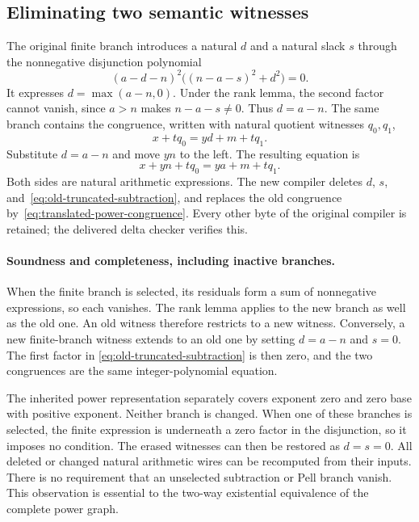 \subsection{Eliminating two semantic witnesses}

The original finite branch introduces a natural $d$ and a natural slack $s$
through the nonnegative disjunction polynomial
\begin{equation}\label{eq:old-truncated-subtraction}
 (a-d-n)^2\bigl((n-a-s)^2+d^2\bigr)=0.
\end{equation}
It expresses $d=\max(a-n,0)$. Under the rank lemma, the second factor
cannot vanish, since $a>n$ makes $n-a-s\ne0$. Thus $d=a-n$.
The same branch contains the congruence, written with natural quotient
witnesses $q_0,q_1$,
\[
 x+tq_0=yd+m+tq_1.
\]
Substitute $d=a-n$ and move $yn$ to the left. The resulting equation is
\begin{equation}\label{eq:translated-power-congruence}
 x+yn+tq_0=ya+m+tq_1.
\end{equation}
Both sides are natural arithmetic expressions. The new compiler deletes
$d$, $s$, and~\eqref{eq:old-truncated-subtraction}, and replaces the old
congruence by~\eqref{eq:translated-power-congruence}. Every other byte of
the original compiler is retained; the delivered delta checker verifies this.

\paragraph{Soundness and completeness, including inactive branches.}
When the finite branch is selected, its residuals form a sum of
nonnegative expressions, so each vanishes. The rank lemma applies to the
new branch as well as the old one. An old witness therefore restricts to a
new witness. Conversely, a new finite-branch witness extends to an old one
by setting $d=a-n$ and $s=0$. The first factor in
\eqref{eq:old-truncated-subtraction} is then zero, and the two congruences
are the same integer-polynomial equation.

The inherited power representation separately covers exponent zero and
zero base with positive exponent. Neither branch is changed. When one of
these branches is selected, the finite expression is underneath a zero
factor in the disjunction, so it imposes no condition. The erased witnesses
can then be restored as $d=s=0$. All deleted or changed natural arithmetic
wires can be recomputed from their inputs. There is no requirement that an
unselected subtraction or Pell branch vanish. This observation is essential
to the two-way existential equivalence of the complete power graph.

